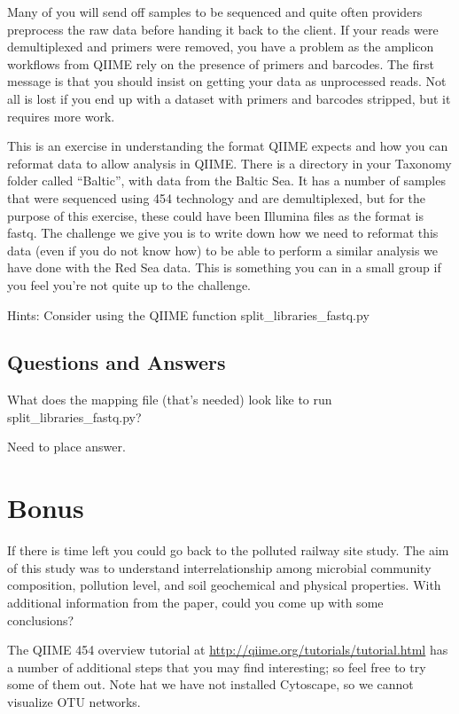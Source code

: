 Many of you will send off samples to be sequenced and quite often providers preprocess the raw data before handing it back to the client. If your reads were demultiplexed and primers were removed, you have a problem as the amplicon workflows from QIIME rely on the presence of primers and barcodes. The first message is that you should insist on getting your data as unprocessed reads. Not all is lost if you end up with a dataset with primers and barcodes stripped, but it requires more work.

This is an exercise in understanding the format QIIME expects and how you can reformat data to allow analysis in QIIME.
There is a directory in your Taxonomy folder called “Baltic”, with data from the Baltic Sea. It has a number of samples that were sequenced using 454 technology and are demultiplexed, but for the purpose of this exercise, these could have been Illumina files as the format is fastq. 
The challenge we give you is to write down how we need to reformat this data (even if you do not know how) to be able to perform a similar analysis we have done with the Red Sea data. This is something you can in a small group if you feel you're not quite up to the challenge. 

Hints:
Consider using the QIIME function split\_libraries\_fastq.py

\subsection{Questions and Answers}
\begin{questions}
What does the mapping file (that's needed) look like to run split\_libraries\_fastq.py? 
\begin{answer}
Need to place answer.
\end{answer}

\end{questions}

\section{Bonus}

If there is time left you could go back to the polluted railway site study. The aim of this study was to understand interrelationship among microbial community composition, pollution level, and soil geochemical and physical properties. With additional information from the paper, could you come up with some conclusions?

The QIIME 454 overview tutorial at \url{http://qiime.org/tutorials/tutorial.html} has a number of additional steps that you may find interesting; so feel free to try some of them out. Note hat we have not installed Cytoscape, so we cannot visualize OTU networks.

